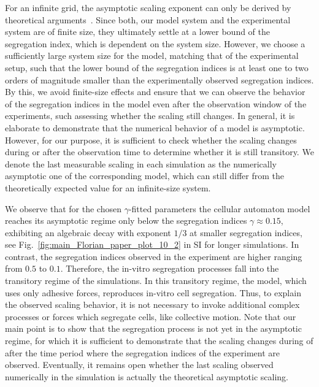 \documentclass[10pt,letterpaper]{article}
\newcommand{\figref}[1]{Fig.~\ref{fig:#1}}
\begin{document}
For an infinite grid, the asymptotic scaling exponent can only be derived
by theoretical arguments~\cite{WitBacVoi2012, NasNar2017, GarNieRum2003, BerBraHaa2018}.
Since both, our model
system and the experimental system are of finite size, they ultimately
settle at a lower bound of the segregation index, which is dependent on the
system size. However, we choose a sufficiently large system size for the
model, matching that of the experimental setup, such that the lower bound of
the segregation indices is at least one to two orders of magnitude smaller than
the experimentally observed segregation indices. By this, we avoid finite-size
effects and ensure that we can observe the behavior of the segregation indices
in the model even after the observation window of the experiments, such assessing whether the
scaling still changes. In general, it is elaborate to demonstrate that the numerical
behavior of a model is asymptotic. However, for our purpose, it is sufficient
to check whether the scaling changes during or after the observation time to
determine whether it is still transitory. We denote the last measurable scaling
in each simulation as the numerically asymptotic one of the corresponding model, which can
still differ from the theoretically expected value for an infinite-size system.

We observe that for the chosen $\gamma$-fitted parameters the cellular automaton model
reaches its asymptotic regime only below the segregation indices
$\gamma\approx0.15$, exhibiting an algebraic decay with exponent $1/3$
at smaller segregation indices, see
\figref{main_Florian_paper_plot_10_2} in SI for longer simulations. In
contrast, the segregation indices observed in the experiment are
higher ranging from $0.5$ to $0.1$. Therefore, the in-vitro
segregation processes fall into the transitory regime of the
simulations. In this transitory regime, the model, which uses only
adhesive forces, reproduces in-vitro cell segregation. Thus, to
explain the observed scaling behavior, it is not necessary to invoke
additional complex processes or forces which segregate cells, like
collective motion. Note that our main point is to show that the segregation
process is not yet in the asymptotic regime, for which it is sufficient to
demonstrate that the scaling changes during of after the time period where
the segregation indices of the experiment are observed. Eventually, it remains
open whether the last scaling observed numerically in the simulation is actually
the theoretical asymptotic scaling.
\end{document}
